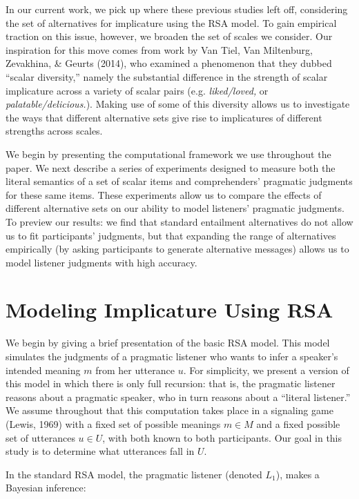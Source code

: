 \documentclass[10pt, letterpaper]{article}
\begin{document}
In our current work, we pick up where these previous studies left off,
considering the set of alternatives for implicature using the RSA model.
To gain empirical traction on this issue, however, we broaden the set of
scales we consider. Our inspiration for this move comes from work by Van
Tiel, Van Miltenburg, Zevakhina, \& Geurts (2014), who examined a
phenomenon that they dubbed ``scalar diversity,'' namely the substantial
difference in the strength of scalar implicature across a variety of
scalar pairs (e.g. \emph{liked/loved,} or \emph{palatable/delicious.}).
Making use of some of this diversity allows us to investigate the ways
that different alternative sets give rise to implicatures of different
strengths across scales.

We begin by presenting the computational framework we use throughout the
paper. We next describe a series of experiments designed to measure both
the literal semantics of a set of scalar items and comprehenders'
pragmatic judgments for these same items. These experiments allow us to
compare the effects of different alternative sets on our ability to
model listeners' pragmatic judgments. To preview our results: we find
that standard entailment alternatives do not allow us to fit
participants' judgments, but that expanding the range of alternatives
empirically (by asking participants to generate alternative messages)
allows us to model listener judgments with high accuracy.

\section{Modeling Implicature Using
RSA}\label{modeling-implicature-using-rsa}

We begin by giving a brief presentation of the basic RSA model. This
model simulates the judgments of a pragmatic listener who wants to infer
a speaker's intended meaning \(m\) from her utterance \(u\). For
simplicity, we present a version of this model in which there is only
full recursion: that is, the pragmatic listener reasons about a
pragmatic speaker, who in turn reasons about a ``literal listener.'' We
assume throughout that this computation takes place in a signaling game
(Lewis, 1969) with a fixed set of possible meanings \(m \in M\) and a
fixed possible set of utterances \(u \in U\), with both known to both
participants. Our goal in this study is to determine what utterances
fall in \(U\).

In the standard RSA model, the pragmatic listener (denoted \(L_1\)),
makes a Bayesian inference:
\end{document}
